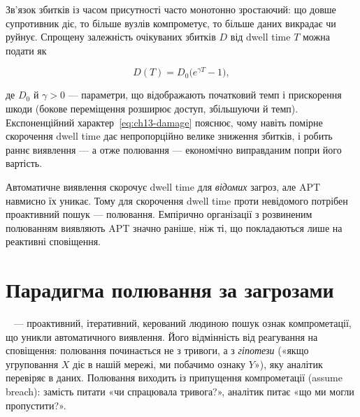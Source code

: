 Зв'язок збитків із часом присутності часто монотонно зростаючий: що довше супротивник діє, то більше вузлів компрометує, то більше даних викрадає чи руйнує. Спрощену залежність очікуваних збитків $D$ від dwell time $T$ можна подати як

\begin{equation}
D(T) = D_0\bigl(e^{\gamma T} - 1\bigr),
\label{eq:ch13-damage}
\end{equation}

де $D_0$ й $\gamma>0$ --- параметри, що відображають початковий темп і прискорення шкоди (бокове переміщення розширює доступ, збільшуючи й темп). Експоненційний характер~\eqref{eq:ch13-damage} пояснює, чому навіть помірне скорочення dwell time дає непропорційно велике зниження збитків, і робить раннє виявлення --- а отже полювання --- економічно виправданим попри його вартість.

Автоматичне виявлення скорочує dwell time для \emph{відомих} загроз, але APT навмисно їх уникає. Тому для скорочення dwell time проти невідомого потрібен проактивний пошук --- полювання. Емпірично організації з розвиненим полюванням виявляють APT значно раніше, ніж ті, що покладаються лише на реактивні сповіщення.

\section{Парадигма полювання за загрозами}\label{sec:ch13-hunting}

~\cite{ch13:sqrrl} --- проактивний, ітеративний, керований людиною пошук ознак компрометації, що уникли автоматичного виявлення. Його відмінність від реагування на сповіщення: полювання починається не з тривоги, а з \emph{гіпотези} («якщо угруповання $X$ діє в нашій мережі, ми побачимо ознаку $Y$»), яку аналітик перевіряє в даних. Полювання виходить із припущення компрометації (assume breach): замість питати «чи спрацювала тривога?», аналітик питає «що ми могли пропустити?».

\begin{tikzfig}
\end{tikzfig}

